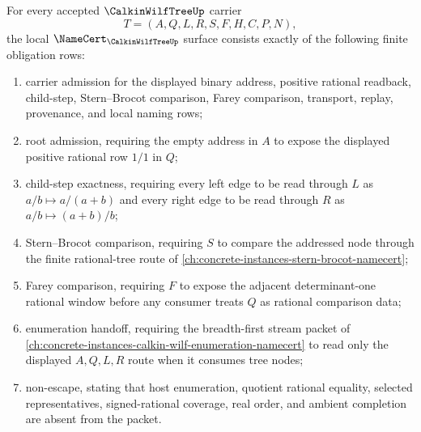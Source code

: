 \begin{theorem}
\label{thm:calkin-wilf-tree-namecert-obligations}
For every accepted $\CalkinWilfTreeUp$ carrier
$$
T=(A,Q,L,R,S,F,H,C,P,N),
$$
the local $\NameCert_{\CalkinWilfTreeUp}$ surface consists exactly of the following finite obligation rows:
\begin{enumerate}
\item carrier admission for the displayed binary address, positive rational readback, child-step, Stern--Brocot comparison, Farey comparison, transport, replay, provenance, and local naming rows;
\item root admission, requiring the empty address in $A$ to expose the displayed positive rational row $1/1$ in $Q$;
\item child-step exactness, requiring every left edge to be read through $L$ as $a/b \mapsto a/(a+b)$ and every right edge to be read through $R$ as $a/b \mapsto (a+b)/b$;
\item Stern--Brocot comparison, requiring $S$ to compare the addressed node through the finite rational-tree route of \autoref{ch:concrete-instances-stern-brocot-namecert};
\item Farey comparison, requiring $F$ to expose the adjacent determinant-one rational window before any consumer treats $Q$ as rational comparison data;
\item enumeration handoff, requiring the breadth-first stream packet of \autoref{ch:concrete-instances-calkin-wilf-enumeration-namecert} to read only the displayed $A,Q,L,R$ route when it consumes tree nodes;
\item non-escape, stating that host enumeration, quotient rational equality, selected representatives, signed-rational coverage, real order, and ambient completion are absent from the packet.
\end{enumerate}
\end{theorem}
